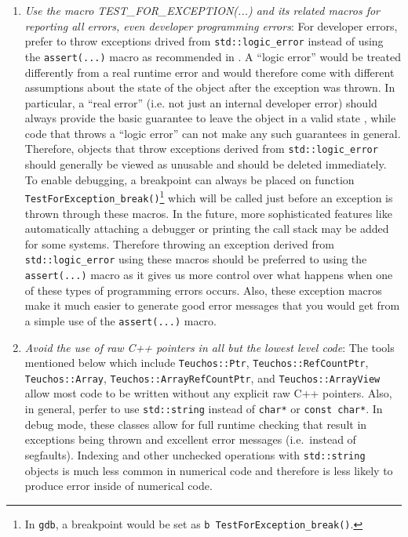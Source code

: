 \begin{enumerate}

{}\item\textit{Use the macro TEST\-\_FOR\-\_EXCEPTION(...) and its related
macros for reporting all errors, even developer programming errors}: For
developer errors, prefer to throw exceptions drived from
{}\texttt{std\-::logic\-\_error} instead of using the {}\texttt{assert(...)}
macro as recommended in {}\cite[Item 68]{C++CodingStandards05}.  A ``logic
error'' would be treated differently from a real runtime error and would
therefore come with different assumptions about the state of the object after
the exception was thrown.  In particular, a ``real error'' (i.e. not just an
internal developer error) should always provide the basic guarantee to leave
the object in a valid state {}\cite[Item 71]{C++CodingStandards05}, while code
that throws a ``logic error'' can not make any such guarantees in general.
Therefore, objects that throw exceptions derived from
{}\texttt{std\-::logic\-\_error} should generally be viewed as unusable and
should be deleted immediately.  To enable debugging, a breakpoint can always
be placed on function {}\texttt{Test\-For\-Exception\-\_break()}\footnote{In
{}\texttt{gdb}, a breakpoint would be set as {}\texttt{b
Test\-For\-Exception\-\_break()}.} which will be called just before an
exception is thrown through these macros.  In the future, more sophisticated
features like automatically attaching a debugger or printing the call stack
may be added for some systems.  Therefore throwing an exception derived from
{}\texttt{std\-::logic\-\_error} using these macros should be preferred to
using the {}\texttt{assert(...)} macro as it gives us more control over what
happens when one of these types of programming errors occurs.  Also, these
exception macros make it much easier to generate good error messages that you
would get from a simple use of the {}\texttt{assert(...)} macro.

{}\item\textit{Avoid the use of raw C++ pointers in all but the lowest level
code}: The tools mentioned below which include {}\texttt{Teuchos::\-Ptr},
{}\texttt{Teuchos::\-Ref\-Count\-Ptr}, {}\texttt{Teuchos::\-Array},
{}\texttt{Teuchos::\-Array\-Ref\-Count\-Ptr}, and
{}\texttt{Teuchos::\-Array\-View} allow most code to be written without any
explicit raw C++ pointers.  Also, in general, perfer to use
{}\texttt{std\-::string} instead of {}\texttt{char*} or {}\texttt{const
char*}.  In debug mode, these classes allow for full runtime checking that
result in exceptions being thrown and excellent error messages (i.e.\ instead
of segfaults).  Indexing and other unchecked operations with
{}\texttt{std\-::string} objects is much less common in numerical code and
therefore is less likely to produce error inside of numerical code.


\end{enumerate}
